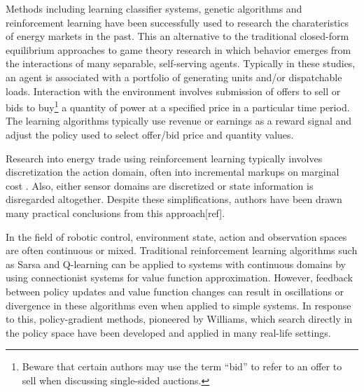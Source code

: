 
Methods including learning classifier systems, genetic algorithms and
reinforcement learning have been successfully used to research the
charateristics of energy markets in the past\cite{anke:2008}.  This an
alternative to the traditional closed-form equilibrium approaches to game
theory research in which behavior emerges from the interactions of many
separable, self-serving agents. Typically in these studies, an agent is
associated with a portfolio of generating units and/or dispatchable
loads. Interaction with the environment involves submission of offers to sell
or bids to buy\footnote{Beware that certain authors may use the term ``bid''
to refer to an offer to sell when discussing single-sided auctions.} a
quantity of power at a specified price in a particular time period.  The
learning algorithms typically use revenue or earnings as a reward signal and
adjust the policy used to select offer/bid price and quantity values.

Research into energy trade using reinforcement learning typically
involves discretization the action domain, often into incremental markups
on marginal cost \cite{anke:2008}. Also, either sensor domains are discretized
or state information is disregarded altogether.  Despite these simplifications,
authors have been drawn many practical conclusions from this approach[ref].

In the field of robotic control, environment state, action and observation
spaces are often continuous or mixed.
Traditional reinforcement learning algorithms such as Sarsa and Q-learning can
be applied to systems with continuous domains by using connectionist systems
for value function approximation\cite{barto:neuron}. However, feedback
between policy updates and value function changes can result in oscillations
or divergence in these algorithms even when applied to simple
systems\cite{peters:enac}.  In response to this, policy-gradient methods,
pioneered by Williams\cite{williams:reinforce}, which search directly in the
policy space have been developed and applied in many real-life
settings\cite{barto:policy,shaal:robots,moody:direct,peshkin:routing}.

